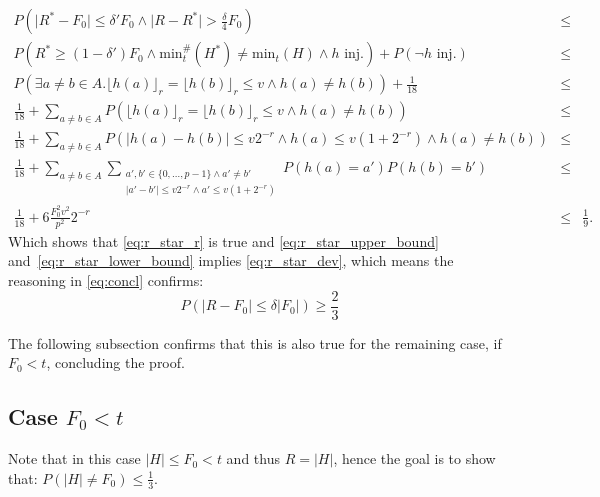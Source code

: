 \documentclass[11pt,a4paper]{article}
\newcommand{\size}[1]{\lvert#1\rvert}
\begin{document}
\begin{eqnarray*}
    P\left( \size{R^*-F_0} \leq \delta' F_0 \wedge \size{R-R^*} > \frac{\delta}{4} F_0 \right) & \leq & \\
    P\left( R^* \geq (1-\delta') F_0 \wedge \mathrm{min}_t^{\#}(H^*) \neq \mathrm{min}_t(H) \wedge h \textrm{ inj.}\right) + P(\neg h \textrm{ inj.}) & \leq & \\
    P\left( \exists a \neq b \in A. \lfloor h(a) \rfloor_r = \lfloor h(b) \rfloor_r \leq v \wedge h(a) \neq h(b) \right) + \frac{1}{18} & \leq & \\
    \frac{1}{18} + \sum_{a \neq b \in A} P\left(\lfloor h(a) \rfloor_r = \lfloor h(b) \rfloor_r \leq v \wedge h(a) \neq h(b) \right) & \leq & \\
    \frac{1}{18} + \sum_{a \neq b \in A} P\left(\size{h(a) - h(b)} \leq v 2^{-r} \wedge h(a) \leq v (1+2^{-r}) \wedge h(a) \neq h(b) \right) & \leq & \\
    \frac{1}{18} + \sum_{a \neq b \in A} \sum_{\substack{a', b' \in \{0,\ldots, p-1\} \wedge a' \neq b' \\ \size{a'-b'} \leq v 2^{-r} \wedge a' \leq v (1+2^{-r})}} P(h(a) = a') P(h(b)= b') & \leq & \\
    \frac{1}{18} + 6 \frac{F_0^2 v^2}{p^2} 2^{-r} & \leq & \frac{1}{9} \textrm{.}
\end{eqnarray*}
Which shows that \autoref{eq:r_star_r} is true and \autoref{eq:r_star_upper_bound} and~\ref{eq:r_star_lower_bound} implies 
\autoref{eq:r_star_dev}, which means the reasoning in \autoref{eq:concl} confirms:
\begin{equation}
    P(\size{R - F_0} \leq \delta \size{F_0}) \geq \frac{2}{3}
\end{equation}

The following subsection confirms that this is also true for the remaining case, if $F_0 < t$, concluding the proof.
\subsection{Case $F_0 < t$}
Note that in this case $\size{H} \leq F_0 < t$ and thus $R = \size{H}$, hence the goal is to show that:
$P(\size{H} \neq F_0) \leq \frac{1}{3}$.
\end{document}
